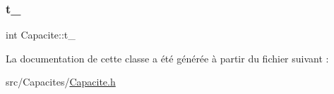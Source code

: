 \mbox{\label{class_capacite_ac743cb7c9605c9e3205885cdcf14d2dd}} 
\subsubsection{\texorpdfstring{t\+\_\+}{t\_}}
{\footnotesize\ttfamily int Capacite\+::t\+\_\+\hspace{0.3cm}{\ttfamily [protected]}}



La documentation de cette classe a été générée à partir du fichier suivant \+:\begin{DoxyCompactItemize}
\item 
src/\+Capacites/\hyperlink{_capacite_8h}{Capacite.\+h}\end{DoxyCompactItemize}

